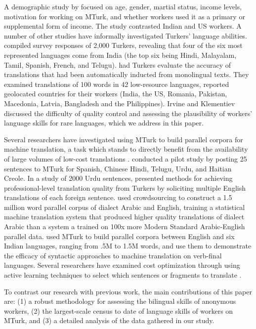 \documentclass[11pt]{article}
\begin{document}
A demographic study by  focused on age, gender, martial status, income levels, motivation for working on MTurk, and whether workers used it as a primary or supplemental form of income.  The study contrasted Indian and US workers. 
A number of other studies have informally investigated Turkers' language abilities.   compiled survey responses of 2,000 Turkers, revealing that four of the six most represented languages come from India (the top six being Hindi, Malayalam, Tamil, Spanish, French, and Telugu).   had Turkers evaluate the accuracy of translations that had been automatically inducted from monolingual texts.  They examined translations of 100 words in 42 low-resource languages, reported geolocated countries for their workers (India, the US, Romania, Pakistan, Macedonia, Latvia, Bangladesh and the Philippines).  Irvine and Klementiev discussed the difficulty of quality control and assessing the plausibility of workers' language skills for rare languages, which we address in this paper. 

Several researchers have investigated using MTurk to build parallel corpora for machine translation, a task which stands to directly benefit from the availability of large volumes of low-cost translations \cite{Germann2001}.   conducted a pilot study by posting 25 sentences to MTurk for Spanish, Chinese Hindi, Telugu, Urdu, and Haitian Creole.  In a study of 2000 Urdu sentences, 
 presented methods for achieving professional-level translation quality from Turkers by soliciting multiple English translations of each foreign sentence. 
 used crowdsourcing to construct a 1.5 million word parallel corpus of dialect Arabic and English, training a statistical machine translation system that produced higher quality translations of dialect Arabic than a system a trained on 100x more Modern Standard Arabic-English parallel data.   used MTurk to build parallel corpora between English and six Indian languages, ranging from .5M to 1.5M words, and use them to demonstrate the efficacy of syntactic approaches to machine translation on verb-final languages.  
Several researchers have examined cost optimization through using active learning techniques to select which sentences or fragments to translate \cite{ambati_naacl,bloodgood-callisonburch:2010:ACL,AmbatiThesis}.

To contrast our research with previous work, the main contributions of this paper are: (1) a robust methodology for assessing the bilingual  skills of anonymous workers, (2) the largest-scale census to date of language skills of workers on MTurk, and (3) a detailed analysis of the data gathered in our study.
\end{document}
